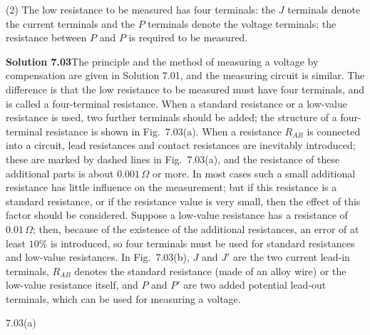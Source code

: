 (2) The low resistance to be measured has four terminals: the $J$ terminals denote the current terminals and the $P$ terminals denote the voltage terminals; the resistance between $P$ and $P$ is required to be measured.

\textbf{Solution 7.03}\quad The principle and the method of measuring a voltage by compensation are given in Solution 7.01, and the measuring circuit is similar. The difference is that the low resistance to be measured must have four terminals, and is called a four-terminal resistance. When a standard resistance or a low-value resistance is used, two further terminals should be added; the structure of a four-terminal resistance is shown in Fig.~7.03(a). When a resistance $R_{AB}$ is connected into a circuit, lead resistances and contact resistances are inevitably introduced; these are marked by dashed lines in Fig.~7.03(a), and the resistance of these additional parts is about $0.001\,\Omega$ or more. In most cases such a small additional resistance has little influence on the measurement; but if this resistance is a standard resistance, or if the resistance value is very small, then the effect of this factor should be considered. Suppose a low-value resistance has a resistance of $0.01\,\Omega$; then, because of the existence of the additional resistances, an error of at least $10\%$ is introduced, so four terminals must be used for standard resistances and low-value resistances. In Fig.~7.03(b), $J$ and $J'$ are the two current lead-in terminals, $R_{AB}$ denotes the standard resistance (made of an alloy wire) or the low-value resistance itself, and $P$ and $P'$ are two added potential lead-out terminals, which can be used for measuring a voltage.

\begin{figbox}{7.03(a)}
\end{figbox}

